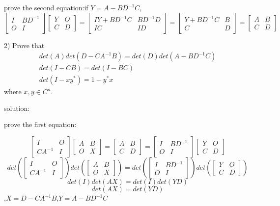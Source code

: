\documentclass{article}
\begin{document}
\begin{enumerate}
		prove the second equation:if $Y=A-BD^{-1}C$,\[ \begin{bmatrix} I&BD^{-1}\\O&I \end{bmatrix} \begin{bmatrix} Y&O\\C&D \end{bmatrix}
		= \begin{bmatrix} IY+BD^{-1}C & BD^{-1}D \\ IC &ID \end{bmatrix}
		= \begin{bmatrix} Y+BD^{-1}C & B \\ C & D \end{bmatrix}
		=\begin{bmatrix} A&B\\C&D \end{bmatrix}
		\] 
		
		2) Prove that
		\begin{gather}
			det(A)det(D-CA^{-1}B)=det(D)det(A-BD^{-1}C)\\
			det(I-CB)=det(I-BC)\\
			det(I-xy^*) = 1-y^*x
		\end{gather}
		where $x, y \in C^n$.
		
		solution:$ $ 
		
		prove the first equation:$ $
		
		\[   \begin{bmatrix} I&O\\{CA^{-1}}&I \end{bmatrix} \begin{bmatrix} A&B\\O&X \end{bmatrix} 
		=\begin{bmatrix} A&B\\C&D \end{bmatrix}
		 = \begin{bmatrix} I&BD^{-1}\\O&I \end{bmatrix} \begin{bmatrix} Y&O\\C&D \end{bmatrix}\] 
		 \[ det(\begin{bmatrix} I&O\\{CA^{-1}}&I \end{bmatrix}) det(\begin{bmatrix} A&B\\O&X \end{bmatrix}) 
		 =det(\begin{bmatrix} I&BD^{-1}\\O&I \end{bmatrix}) det(\begin{bmatrix} Y&O\\C&D \end{bmatrix})\]
		 \[ det(I)det(AX)=det(I)det(YD)\]
		 \[ det(AX)=det(YD)\],$X=D-CA^{-1}B$,$Y=A-BD^{-1}C$
		 

\end{enumerate}
\end{document}
